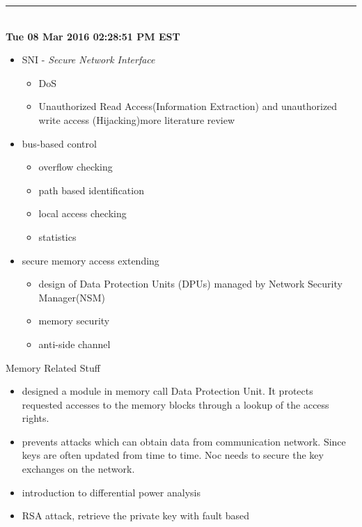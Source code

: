 \documentclass[]{article}
\begin{document}
\rule[-0.1cm]{7.5in}{0.01cm}\\
\noindent \textbf{Tue 08 Mar 2016 02:28:51 PM EST}
\begin{itemize}
    \item SNI - \textit{Secure Network Interface} 
        \begin{itemize} 
            \item DoS
            \item Unauthorized Read Access(Information Extraction) and unauthorized write access (Hijacking){\color{red}more literature review}
        \end{itemize}        
    \item bus-based control~\cite{diguet2007noc}
        \begin{itemize}
            \item overflow checking
            \item path based identification
            \item local access checking
            \item statistics
        \end{itemize}
    \item secure memory access \cite{goossens2008hardwired} extending \cite{fiorin2007data}
        \begin{itemize}
            \item design of Data Protection Units (DPUs) managed by Network Security Manager(NSM)
            \item memory security \cite{gebotys2003security}
            \item anti-side channel \cite{evain2005noc}
        \end{itemize} 
\end{itemize}

Memory Related Stuff
\begin{itemize}
    \item \cite{fiorin2007data} designed a module in memory call Data
Protection Unit. It protects requested accesses to the memory blocks through a
lookup of the access rights.
    \item \cite{gebotys2003security} prevents attacks which can obtain data
from communication network. Since keys are often updated from time to time. Noc
needs to secure the key exchanges on the network.
\end{itemize}

\begin{itemize}
	\item \cite{kocher2011introduction} introduction to differential power analysis
	\item \cite{pellegrini2010fault} RSA attack, retrieve the private key with fault based  
\end{itemize}
\end{document}
